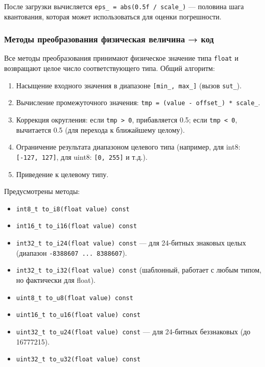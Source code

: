 \documentclass[a4paper,12pt]{article}
\begin{document}
После загрузки вычисляется \texttt{eps\_ = abs(0.5f / scale\_)} — половина шага квантования, которая может использоваться для оценки погрешности.

\subsubsection{Методы преобразования физическая величина → код}

Все методы преобразования принимают физическое значение типа \texttt{float} и возвращают целое число соответствующего типа. Общий алгоритм:

\begin{enumerate}
    \item Насыщение входного значения в диапазоне \texttt{[min\_, max\_]} (вызов \texttt{sut\_}).
    \item Вычисление промежуточного значения: \texttt{tmp = (value - offset\_) * scale\_}.
    \item Коррекция округления: если \texttt{tmp > 0}, прибавляется 0.5; если \texttt{tmp < 0}, вычитается 0.5 (для перехода к ближайшему целому).
    \item Ограничение результата диапазоном целевого типа (например, для int8: \texttt{[-127, 127]}, для uint8: \texttt{[0, 255]} и т.д.).
    \item Приведение к целевому типу.
\end{enumerate}

Предусмотрены методы:

\begin{itemize}
    \item \texttt{int8\_t to\_i8(float value) const}
    \item \texttt{int16\_t to\_i16(float value) const}
    \item \texttt{int32\_t to\_i24(float value) const} — для 24-битных знаковых целых (диапазон \texttt{-8388607 ... 8388607}).
    \item \texttt{int32\_t to\_i32(float value) const} (шаблонный, работает с любым типом, но фактически для float).
    \item \texttt{uint8\_t to\_u8(float value) const}
    \item \texttt{uint16\_t to\_u16(float value) const}
    \item \texttt{uint32\_t to\_u24(float value) const} — для 24-битных беззнаковых (до 16777215).
    \item \texttt{uint32\_t to\_u32(float value) const}
\end{itemize}
\end{document}
